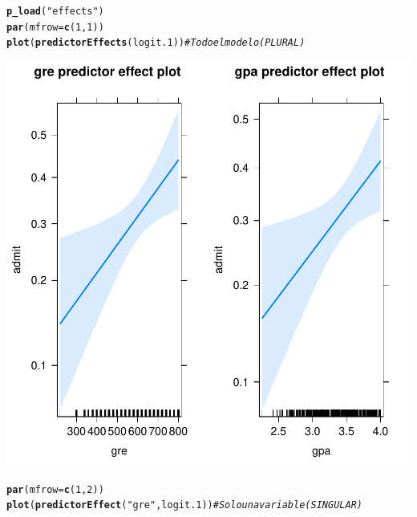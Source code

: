 \documentclass[onesided]{article}\usepackage[]{graphicx}\usepackage[]{color}
\makeatletter
\def\maxwidth{ %
  \ifdim\Gin@nat@width>\linewidth
    \linewidth
  \else
    \Gin@nat@width
  \fi
}
\newcommand{\hlnum}[1]{\textcolor[rgb]{0.686,0.059,0.569}{#1}}%
\newcommand{\hlstr}[1]{\textcolor[rgb]{0.192,0.494,0.8}{#1}}%
\newcommand{\hlcom}[1]{\textcolor[rgb]{0.678,0.584,0.686}{\textit{#1}}}%
\newcommand{\hlstd}[1]{\textcolor[rgb]{0.345,0.345,0.345}{#1}}%
\newcommand{\hlkwc}[1]{\textcolor[rgb]{0.333,0.667,0.333}{#1}}%
\newcommand{\hlkwd}[1]{\textcolor[rgb]{0.737,0.353,0.396}{\textbf{#1}}}%
\newenvironment{kframe}{%
 \def\at@end@of@kframe{}%
 \ifinner\ifhmode%
  \def\at@end@of@kframe{\end{minipage}}%
  \begin{minipage}{\columnwidth}%
 \fi\fi%
 \def\FrameCommand##1{\hskip\@totalleftmargin \hskip-\fboxsep
 \colorbox{shadecolor}{##1}\hskip-\fboxsep
     \hskip-\linewidth \hskip-\@totalleftmargin \hskip\columnwidth}%
 \MakeFramed {\advance\hsize-\width
   \@totalleftmargin\z@ \linewidth\hsize
   \@setminipage}}%
 {\par\unskip\endMakeFramed%
 \at@end@of@kframe}
\newenvironment{knitrout}{}{} %
\makeatother
\begin{document}
\begin{knitrout}
\color{fgcolor}\begin{kframe}
\begin{alltt}
\hlkwd{p_load}\hlstd{(}\hlstr{"effects"}\hlstd{)}
\hlkwd{par}\hlstd{(}\hlkwc{mfrow}\hlstd{=}\hlkwd{c}\hlstd{(}\hlnum{1}\hlstd{,}\hlnum{1}\hlstd{))}
\hlkwd{plot}\hlstd{(}\hlkwd{predictorEffects}\hlstd{(logit.1))} \hlcom{# Todo el modelo (PLURAL)}
\end{alltt}
\end{kframe}

{\centering \includegraphics[width=\maxwidth]{figure/predict:2-1} 

}


\begin{kframe}\begin{alltt}
\hlkwd{par}\hlstd{(}\hlkwc{mfrow}\hlstd{=}\hlkwd{c}\hlstd{(}\hlnum{1}\hlstd{,}\hlnum{2}\hlstd{))}
\hlkwd{plot}\hlstd{(}\hlkwd{predictorEffect}\hlstd{(}\hlstr{"gre"}\hlstd{, logit.1))} \hlcom{# Solo una variable (SINGULAR)}
\end{alltt}
\end{kframe}


\end{knitrout}
\end{document}
